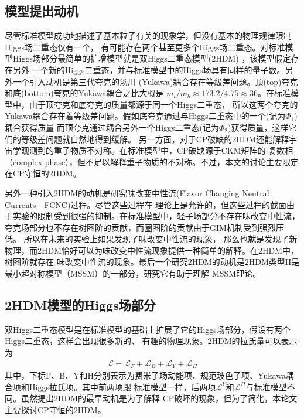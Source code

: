 \subsection{模型提出动机}
尽管标准模型成功地描述了基本粒子有关的现象学，但没有基本的物理规律限制Higgs场二重态仅有一个，
有可能存在两个甚至更多个Higgs场二重态。对标准模型Higgs场部分最简单的扩增模型就是双Higgs二重态模型(2HDM)
\cite{higgs-guide}，该模型假定存在另外
一个新的Higgs二重态，并与标准模型中的Higgs场具有同样的量子数。另外一个引入动机是第三代夸克的汤川
(Yukawa)耦合存在等级差问题。顶(top)夸克和底(bottom)夸克的Yukawa耦合之比大概是
$m_t/m_b \approx 173.2/4.75 \approx 36$。在标准模型中，由于顶夸克和底夸克的质量都源于同一个Higgs二重态，
所以这两个夸克的Yukawa耦合存在着等级差问题。假如底夸克通过与Higgs二重态中的一个(记为$\Phi_1$)耦合获得质量
而顶夸克通过耦合另外一个Higgs二重态(记为$\Phi_2$)获得质量，这样它们的等级差问题就自然地得到缓解。
另一方面，对于CP破缺的2HDM还能解释宇宙学观测到的重子物质不对称。在标准模型中，CP破缺源于CKM矩阵的
复数相（complex phase），但不足以解释重子物质的不对称。不过，本文的讨论主要限定在CP守恒的2HDM。

另外一种引入2HDM的动机是研究味改变中性流(Flavor Changing Neutral Currents - FCNC)过程。尽管这些过程在
理论上是允许的，但这些过程的截面由于实验的限制受到很强的抑制。在标准模型中，轻子场部分不存在味改变中性流，
夸克场部分也不存在树图阶的贡献，而圈图阶的贡献由于GIM机制\cite{GIM}受到强烈压低。
所以在未来的实验上如果发现了味改变中性流的现象，
那么也就是发现了新物理，而2HDM恰好可以为味改变中性流现象提供一种简单的解释。在2HDM中，树图阶就存在
味改变中性流的现象。最后一个研究2HDM的动机是2HDM类型II是最小超对称模型（MSSM）的一部分，研究它有助于理解
MSSM理论。

\subsection{2HDM模型的Higgs场部分}
双Higgs二重态模型是在标准模型的基础上扩展了它的Higgs场部分，假设有两个Higgs二重态，这样会出现很多新的、
有趣的物理现象。2HDM的拉氏量可以表示为
\begin{eqnarray}
\mathscr{L} = \mathscr{L}_F + \mathscr{L}_B + \mathscr{L}_Y + \mathscr{L}_H
\end{eqnarray}
其中，下标F、B、Y和H分别表示为费米子场动能项、规范玻色子项、Yukawa耦合项和Higgs拉氏项。其中前两项跟
标准模型一样，后两项$\mathscr{L}^Y$和$\mathscr{L}^H$与标准模型不同。虽然提出2HDM的最早动机是为了解释
CP破坏的现象，但为了简化，本论文主要探讨CP守恒的2HDM。

